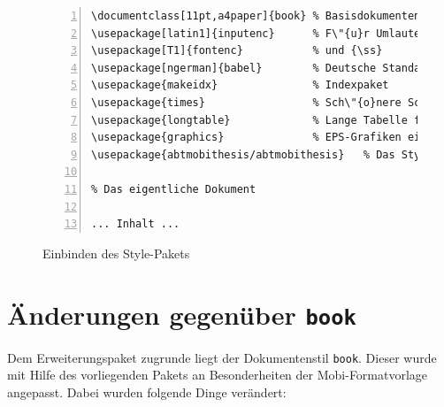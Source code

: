 \begin{figure}[ht]
\centering
\begin{Verbatim}[label=dissertation.tex,numberblanklines=false,fontsize=\scriptsize,numbers=left,frame=single]
\documentclass[11pt,a4paper]{book} % Basisdokumentenklasse
\usepackage[latin1]{inputenc}      % F\"{u}r Umlaute
\usepackage[T1]{fontenc}           % und {\ss}
\usepackage[ngerman]{babel}        % Deutsche Standardbezeichner und Trennung
\usepackage{makeidx}               % Indexpaket
\usepackage{times}                 % Sch\"{o}nere Schriften
\usepackage{longtable}             % Lange Tabelle f\"{u}r Abk\"{u}rzungsverzeichnis
\usepackage{graphics}              % EPS-Grafiken einbinden
\usepackage{abtmobithesis/abtmobithesis}   % Das Stylepaket am Ende einbinden!

% Das eigentliche Dokument

... Inhalt ...

\end{Verbatim}
\caption{Einbinden des Style-Pakets}\label{stylepaket}
\end{figure}


\section{Änderungen gegenüber \texttt{book}}
Dem Erweiterungspaket zugrunde liegt der Dokumentenstil
\texttt{book}. Dieser wurde mit Hilfe des vorliegenden Pakets an
Besonderheiten der Mobi-Formatvorlage angepasst. Dabei wurden
folgende Dinge ver\"{a}ndert:


